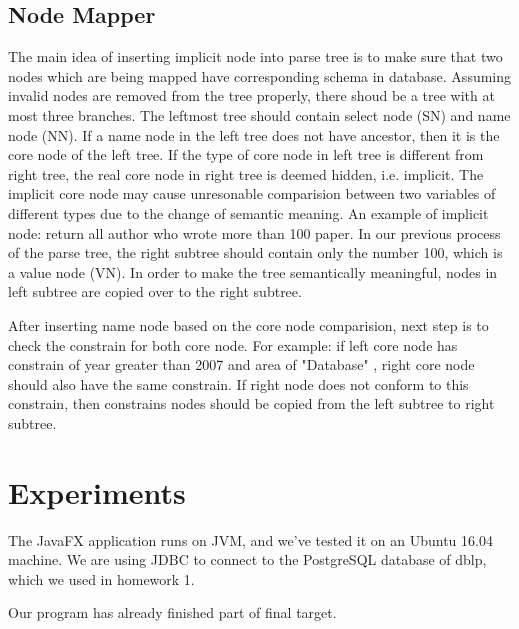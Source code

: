 \documentclass[twocolumn]{article}
\begin{document}
\subsection{Node Mapper}
The main idea of inserting implicit node into parse tree is to make sure that two nodes which are being mapped have corresponding schema in database. Assuming invalid nodes are removed from the tree properly, there shoud be a tree with at most three branches. The leftmost tree should contain select node (SN) and name node (NN). If a name node in the left tree does not have ancestor, then it is the core node of the left tree. If the type of core node in left tree is different from right tree, the real core node in right tree is deemed hidden, i.e. implicit. The implicit core node may cause unresonable comparision between two variables of different types due to the change of semantic meaning. An example of implicit node: return all author who wrote more than 100 paper. In our previous process of the parse tree, the right subtree should contain only the number 100, which is a value node (VN). In order to make the tree semantically meaningful, nodes in left subtree are copied over to the right subtree.

After inserting name node based on the core node comparision, next step is to check the constrain for both core node. For example: if left core node has constrain of year greater than 2007 and area of "Database" , right core node should also have the same constrain. If right node does not conform to this constrain, then constrains nodes should be copied from the left subtree to right subtree. 



\section{Experiments}
The JavaFX application runs on JVM, and we’ve tested it on an Ubuntu 16.04 machine. We are using JDBC to connect to the PostgreSQL database of dblp, which we used in homework 1.

Our program has already finished part of final target. 
\end{document}
